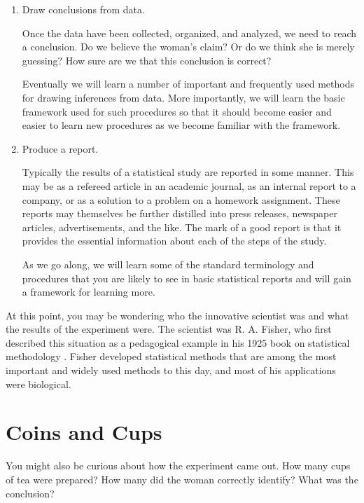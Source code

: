 \documentclass[twoside]{book}
\def\myindex#1{\index{#1}}
\newcounter{example}[section]
\begin{document}
\begin{enumerate}
  \item Draw conclusions from data.

	Once the data have been collected, organized, and analyzed, we need
	to reach a conclusion.  
	Do we believe the woman's claim?  
	Or do we think she is merely guessing?  How sure are we that this
	conclusion is correct?

	Eventually we will
	learn a number of important and frequently used methods for 
	drawing inferences from data.  More importantly, we will learn
	the basic framework used for such procedures so that it should 
	become easier and easier to learn new procedures as we become 
	familiar with the framework.
	

  \item Produce a report.

		Typically the results of a statistical study are reported in 
		some manner.  This may be as a refereed article in an academic 
		journal, as an internal report to a company, or as a solution
		to a problem on a homework assignment.  These reports may themselves
		be further distilled into press releases, newspaper articles,
		advertisements, and the like.  The mark of a good report
		is that it provides the essential information about each 
		of the steps of the study.

		As we go along, we will learn some of the standard terminology and
		procedures that you are likely to see in basic statistical reports and 
		will gain a framework for learning more.  
\end{enumerate}

At this point, you may be wondering who the innovative scientist was and 
what the results of the experiment were.
\myindex{Fisher, R. A.}%
The scientist was R. A. Fisher, who first described this situation
as a pedagogical example in his 1925 book on 
statistical methodology \cite{Fisher:1925:Methods}.
Fisher developed statistical methods that are among the most
important and widely used methods to this day, and most of his 
applications were biological.
\nocite{Fisher:1970:Methods}%


\section{Coins and Cups}
You might also be curious about how the experiment came out.
How many cups of tea were prepared?  How many did the woman 
correctly identify?  What was the conclusion?
\end{document}
